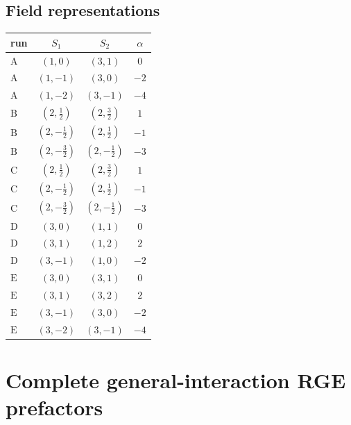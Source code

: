 \documentclass[9pt]{article}
\begin{document}
\subsection*{Field representations}
\begin{longtable}{@{}lccc@{}}
\toprule
run & $S_1$ & $S_2$ & $\alpha$ \\
\midrule
$\mathrm{A}$ & $(1,0)$ & $(3,1)$ & $0$ \\
$\mathrm{A}$ & $(1,-1)$ & $(3,0)$ & $-2$ \\
$\mathrm{A}$ & $(1,-2)$ & $(3,-1)$ & $-4$ \\
$\mathrm{B}$ & $(2,\frac{1}{2})$ & $(2,\frac{3}{2})$ & $1$ \\
$\mathrm{B}$ & $(2,- \frac{1}{2})$ & $(2,\frac{1}{2})$ & $-1$ \\
$\mathrm{B}$ & $(2,- \frac{3}{2})$ & $(2,- \frac{1}{2})$ & $-3$ \\
$\mathrm{C}$ & $(2,\frac{1}{2})$ & $(2,\frac{3}{2})$ & $1$ \\
$\mathrm{C}$ & $(2,- \frac{1}{2})$ & $(2,\frac{1}{2})$ & $-1$ \\
$\mathrm{C}$ & $(2,- \frac{3}{2})$ & $(2,- \frac{1}{2})$ & $-3$ \\
$\mathrm{D}$ & $(3,0)$ & $(1,1)$ & $0$ \\
$\mathrm{D}$ & $(3,1)$ & $(1,2)$ & $2$ \\
$\mathrm{D}$ & $(3,-1)$ & $(1,0)$ & $-2$ \\
$\mathrm{E}$ & $(3,0)$ & $(3,1)$ & $0$ \\
$\mathrm{E}$ & $(3,1)$ & $(3,2)$ & $2$ \\
$\mathrm{E}$ & $(3,-1)$ & $(3,0)$ & $-2$ \\
$\mathrm{E}$ & $(3,-2)$ & $(3,-1)$ & $-4$ \\
\bottomrule
\end{longtable}
\section*{Complete general-interaction RGE prefactors}
\end{document}
